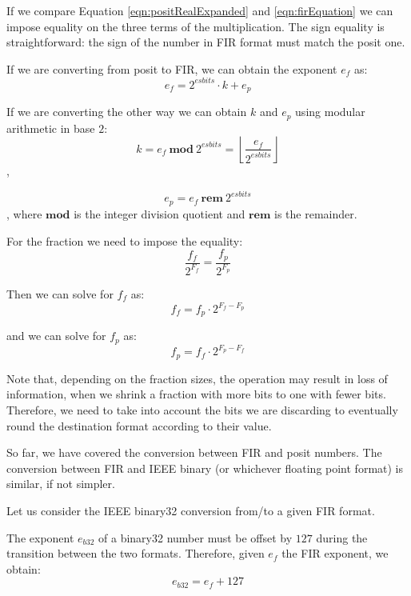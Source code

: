 If we compare Equation \eqref{eqn:positRealExpanded} and \eqref{eqn:firEquation} we can impose equality on the three terms of the multiplication. The sign equality is straightforward: the sign of the number in FIR format must match the posit one.

If we are converting from posit to FIR, we can obtain the exponent $e_f$ as:
\begin{equation}
    e_f = 2^{esbits} \cdot k + e_p
\end{equation}

If we are converting the other way we can obtain $k$ and $e_p$ using modular arithmetic in base $2$: 
\begin{equation}
    k = e_f\ \mathbf{mod}\ 2^{esbits} = \left\lfloor \frac{e_f}{2^{esbits}} \right\rfloor
\end{equation},

\begin{equation}
    e_p = e_f\ \mathbf{rem}\ 2^{esbits}
\end{equation},
where $\mathbf{mod}$ is the integer division quotient and $\mathbf{rem}$ is the remainder.

For the fraction we need to impose the equality:
\begin{equation}\label{eqn:fractionalPartEquivalence}
    \frac{f_f}{2^{F_f}} = \frac{f_p}{2^{F_p}}
\end{equation}

Then we can solve for $f_f$ as:
\begin{equation}
    f_f = f_p \cdot 2^{F_f - F_p}
\end{equation}

and we can solve for $f_p$ as:
\begin{equation}
    f_p = f_f \cdot 2^{F_p - F_f}
\end{equation}

Note that, depending on the fraction sizes, the operation may result in loss of information, when we shrink a fraction with more bits to one with fewer bits.  Therefore, we need to take into account the bits we are discarding to eventually round the destination format according to their value.

So far, we have covered the conversion between FIR and posit numbers. The conversion between FIR and IEEE binary (or whichever floating point format) is similar, if not simpler.

Let us consider the IEEE binary32 conversion from/to a given FIR format. 

The exponent $e_{b32}$ of a binary32 number must be offset by $127$ during the transition between the two formats. Therefore, given $e_f$ the FIR exponent, we obtain:
\begin{equation}
    e_{b32} = e_f + 127
\end{equation}

